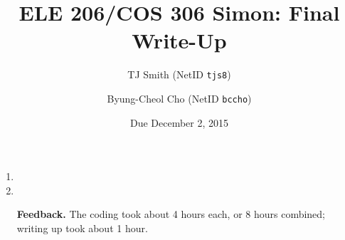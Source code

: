 \documentclass[12pt]{article}
\title{ELE 206/COS 306 Simon: Final Write-Up}
\author{TJ Smith (NetID \texttt{tjs8})\and Byung-Cheol Cho (NetID \texttt{bccho})}
\date{Due December 2, 2015}
\begin{document}
\maketitle

\begin{enumerate}[label=\textbf{Question \arabic*.}]
%
\item 
%
\item 
%
\item[\textbf{Feedback.}] The coding took about 4 hours each, or 8 hours combined; writing up took about 1 hour.
%
\end{enumerate}
\end{document}
